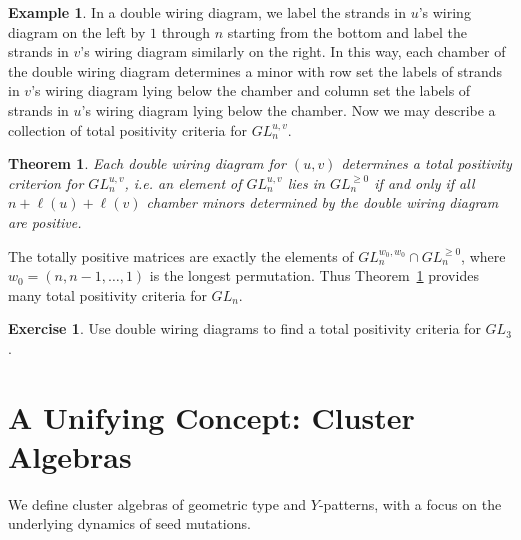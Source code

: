 \documentclass{amsart}
\newtheorem{subtheorem}{Theorem}[theorem]
\theoremstyle{definition}
\newtheorem{example}[theorem]{Example}
\newtheorem{subexercise}{Exercise}[theorem]
\newtheorem{exercise}[theorem]{Exercise}
\theoremstyle{remark}
\numberwithin{equation}{section}
\begin{document}
\begin{example}
    In a double wiring diagram, we label the strands in $u$'s wiring diagram on the left by $1$ through $n$ starting from the bottom and label the strands in $v$'s wiring diagram similarly on the right.  In this way, each chamber of the double wiring diagram determines a minor with row set the labels of strands in $v$'s wiring diagram lying below the chamber and column set the labels of strands in $u$'s wiring diagram lying below the chamber.  Now we may describe a collection of total positivity criteria for $GL_n^{u,v}$.
    \setcounter{subtheorem}{2}
    \begin{subtheorem}\label{th:total positivity criteria}\cite{FZ99}
      Each double wiring diagram for $(u,v)$ determines a total positivity criterion for $GL_n^{u,v}$, i.e. an element of $GL_n^{u,v}$ lies in $GL_n^{\ge0}$ if and only if all $n+\ell(u)+\ell(v)$ chamber minors determined by the double wiring diagram are positive.
    \end{subtheorem}
    The totally positive matrices are exactly the elements of $GL_n^{w_0,w_0}\cap GL_n^{\ge0}$, where $w_0=(n,n-1,\ldots,1)$ is the longest permutation.  Thus Theorem~\ref{th:total positivity criteria} provides many total positivity criteria for $GL_n$.
    \setcounter{subexercise}{3}
    \begin{subexercise}
      Use double wiring diagrams to find a total positivity criteria for $GL_3$.
    \end{subexercise}
  \end{example}



\section{A Unifying Concept: Cluster Algebras}\label{sec:cluster_algebras}
	We define cluster algebras of geometric type and $Y$-patterns, with a focus on the underlying dynamics of seed mutations.
	
\end{document}
